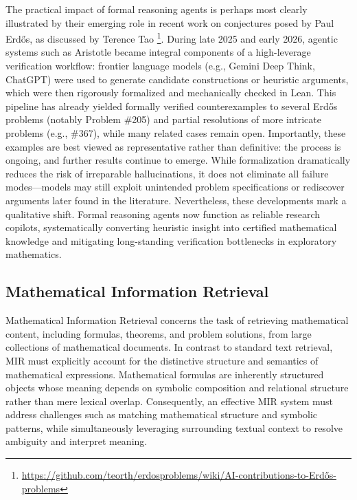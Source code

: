 \documentclass[11pt]{article}
\numberwithin{equation}{section}
\begin{document}
The practical impact of formal reasoning agents is perhaps most clearly illustrated by their emerging role in recent work on conjectures posed by Paul Erdős, as discussed by Terence Tao \footnote{\href{https://github.com/teorth/erdosproblems/wiki/AI-contributions-to-Erd\%C5\%91s-problems}
     {https://github.com/teorth/erdosproblems/wiki/AI-contributions-to-Erdős-problems}}. During late 2025 and early 2026, agentic systems such as Aristotle became integral components of a high-leverage verification workflow: frontier language models (e.g., Gemini Deep Think, ChatGPT) were used to generate candidate constructions or heuristic arguments, which were then rigorously formalized and mechanically checked in Lean. This pipeline has already yielded formally verified counterexamples to several Erdős problems (notably Problem \#205) and partial resolutions of more intricate problems (e.g., \#367), while many related cases remain open. Importantly, these examples are best viewed as representative rather than definitive: the process is ongoing, and further results continue to emerge. While formalization dramatically reduces the risk of irreparable hallucinations, it does not eliminate all failure modes—models may still exploit unintended problem specifications or rediscover arguments later found in the literature. Nevertheless, these developments mark a qualitative shift. Formal reasoning agents now function as reliable research copilots, systematically converting heuristic insight into certified mathematical knowledge and mitigating long-standing verification bottlenecks in exploratory mathematics.

\subsection{Mathematical Information Retrieval}\label{subsec:mir}

Mathematical Information Retrieval concerns the task of retrieving mathematical content, including formulas, theorems, and problem solutions, from large collections of mathematical documents. In contrast to standard text retrieval, MIR must explicitly account for the distinctive structure and semantics of mathematical expressions. Mathematical formulas are inherently structured objects whose meaning depends on symbolic composition and relational structure rather than mere lexical overlap. Consequently, an effective MIR system must address challenges such as matching mathematical structure and symbolic patterns, while simultaneously leveraging surrounding textual context to resolve ambiguity and interpret meaning.
\end{document}
